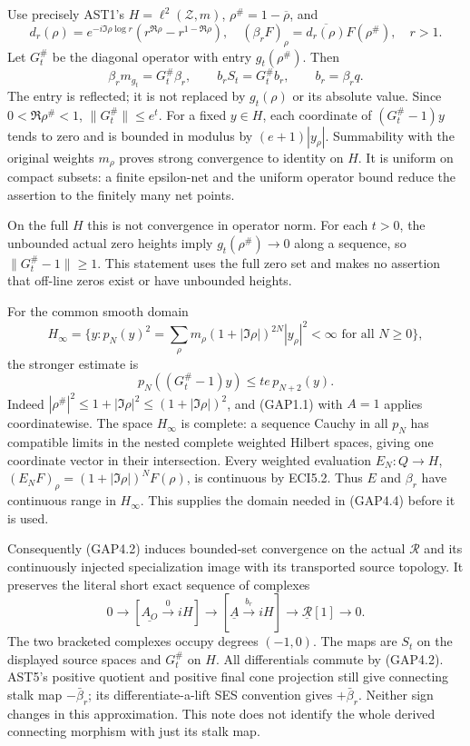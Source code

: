 Use precisely AST1's \(H=\ell^2(\mathscr Z,m)\),
\(\rho^\#=1-\overline\rho\), and \[
d_r(\rho)=e^{-i\Im\rho\log r}(r^{\Re\rho}-r^{1-\Re\rho}),
\quad(\beta_rF)_\rho=\overline{d_r(\rho)}F(\rho^\#),\quad r>1.
\tag{GAP4.1}
\] Let \(G_t^\#\) be the diagonal operator with entry \(g_t(\rho^\#)\).
Then \[
\beta_rm_{g_t}=G_t^\#\beta_r,\qquad
b_rS_t=G_t^\# b_r,\qquad b_r=\beta_rq.
\tag{GAP4.2}
\] The entry is reflected; it is not replaced by \(g_t(\rho)\) or its
absolute value. Since \(0<\Re\rho^\#<1\), \(\|G_t^\#\|\le e^t\). For a
fixed \(y\in H\), each coordinate of \((G_t^\#-1)y\) tends to zero and
is bounded in modulus by \((e+1)|y_\rho|\). Summability with the
original weights \(m_\rho\) proves strong convergence to identity on
\(H\). It is uniform on compact subsets: a finite epsilon-net and the
uniform operator bound reduce the assertion to the finitely many net
points.

On the full \(H\) this is not convergence in operator norm. For each
\(t>0\), the unbounded actual zero heights imply \(g_t(\rho^\#)\to0\)
along a sequence, so \(\|G_t^\#-1\|\ge1\). This statement uses the full
zero set and makes no assertion that off-line zeros exist or have
unbounded heights.

For the common smooth domain \[
H_\infty=\{y:p_N(y)^2=\sum_\rho m_\rho(1+|\Im\rho|)^{2N}|y_\rho|^2<\infty
\text{ for all }N\ge0\},
\tag{GAP4.3}
\] the stronger estimate is \[
p_N((G_t^\#-1)y)\le te\,p_{N+2}(y).
\tag{GAP4.4}
\] Indeed \(|\rho^\#|^2\le1+|\Im\rho|^2\le(1+|\Im\rho|)^2\), and
(GAP1.1) with \(A=1\) applies coordinatewise. The space \(H_\infty\) is
complete: a sequence Cauchy in all \(p_N\) has compatible limits in the
nested complete weighted Hilbert spaces, giving one coordinate vector in
their intersection. Every weighted evaluation \(E_N:Q\to H\),
\((E_NF)_\rho=(1+|\Im\rho|)^NF(\rho)\), is continuous by ECI5.2. Thus
\(E\) and \(\beta_r\) have continuous range in \(H_\infty\). This
supplies the domain needed in (GAP4.4) before it is used.

Consequently (GAP4.2) induces bounded-set convergence on the actual
\(\mathcal R\) and its continuously injected specialization image with
its transported source topology. It preserves the literal short exact
sequence of complexes \[
0\to[\underline{A_O}\xrightarrow0 iH]
\to[\underline A\xrightarrow{b_r}iH]
\to\underline{\mathcal R}[1]\to0.
\tag{GAP4.5}
\] The two bracketed complexes occupy degrees \((-1,0)\). The maps are
\(S_t\) on the displayed source spaces and \(G_t^\#\) on \(H\). All
differentials commute by (GAP4.2). AST5's positive quotient and positive
final cone projection still give connecting stalk map \(-\bar\beta_r\);
its differentiate-a-lift SES convention gives \(+\bar\beta_r\). Neither
sign changes in this approximation. This note does not identify the
whole derived connecting morphism with just its stalk map.

